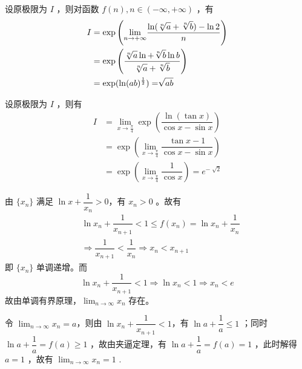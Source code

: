 \begin{Answer}[不要认为令 $ a = b = 1 $ 的结果一定能代表答案\getback{T4}]
    设原极限为 $ I $ ，则对函数 $ f(n),n\in (-\infty,+\infty) $ ，有
    \begin{equation*}
        \begin{aligned}
            I &= \exp \left({\displaystyle\lim_{n\rightarrow +\infty}}
            \dfrac{\ln(\displaystyle\sqrt[n]{a}+\displaystyle\sqrt[n]{b})-\ln 2}{n} \right)\\ &=
            \exp\left(\dfrac{\displaystyle\sqrt[n]{a}\ln+\displaystyle\sqrt[n]{b}\ln b}{\displaystyle\sqrt[n]{a}+\displaystyle\sqrt[n]{b}}\right)
            \\&= \exp(\ln (ab)^\frac{1}{2}) = \displaystyle\sqrt[]{ab}
        \end{aligned}
    \end{equation*}
\end{Answer}

\begin{Answer}
    设原极限为 $ I $ ，则有
    \begin{equation*}
        \begin{aligned}
            I &= {\displaystyle\lim_{x\rightarrow \frac{\pi}{4}}}\exp\left(\dfrac{\ln (\tan x)}
            {\cos x - \sin x}\right) \\&= \exp\left({\displaystyle\lim_{x\rightarrow \frac{\pi}{4}}}
            \dfrac{\tan x - 1}{\cos x - \sin x}\right) \\&=
            \exp({\displaystyle\lim_{x\rightarrow \frac{\pi}{4}}} \dfrac{1}{\cos x}) = e^{-\sqrt[]{2}}
        \end{aligned}
    \end{equation*}
\end{Answer}

\begin{Answer}
    由 $ \{x_n\} $ 满足 $ \ln x + \dfrac{1}{x_n} >0 $，有 $ x_n>0 $ 。故有
    \begin{equation*}
        \begin{aligned}
            &\ln x_n + \dfrac{1}{x_{n+1}} < 1 \leq f(x_n) =\ln x_n + \dfrac{1}{x_n} \\ 
            &\Rightarrow \dfrac{1}{x_{n+1}} < \dfrac{1}{x_n} \Rightarrow x_n < x_{n+1}
        \end{aligned}
    \end{equation*}
    即 $ \{x_n\} $ 单调递增。而 $$
        \ln x_n + \dfrac{1}{x_{n+1}} < 1 \Rightarrow \ln x_n < 1 \Rightarrow x_n < e
    $$
    故由单调有界原理，$ {\displaystyle\lim_{n\rightarrow \infty}}x_n $ 存在。

    令 $ {\displaystyle\lim_{n\rightarrow \infty}}x_n = a $，则由 $ \ln x_n + \dfrac{1}{x_{n+1}} <1  $，有
    $ \ln a + \dfrac{1}{a} \leq 1 $ ；同时 $ \ln a +\dfrac{1}{a} = f(a) \geq1 $ ，故由夹逼定理，有
    $ \ln a + \dfrac{1}{a}= f(a) = 1 $ ，此时解得 $ a = 1 $ ，故有 $ {\displaystyle\lim_{n\rightarrow \infty}}x_n = 1 $ .
\end{Answer}

